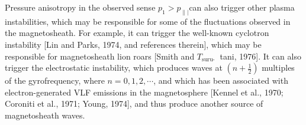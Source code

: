 \documentclass[10pt]{article}
\begin{document}
Pressure anisotropy in the observed sense $p_{1}>p_{\parallel \mid}$can also trigger other plasma instabilities, which may be responsible for some of the fluctuations observed in the magnetosheath. For example, it can trigger the well-known cyclotron instability [Lin and Parks, 1974, and references therein], which may be responsible for magnetosheath lion roars [Smith and $T_{\text {suru- }}$ tani, 1976]. It can also trigger the electrostatic instability, which produces waves at $\left(n+\frac{1}{2}\right)$ multiples of the gyrofrequency, where $n=0,1,2, \cdots$, and which has been associated with electron-generated VLF emissions in the magnetosphere [Kennel et al., 1970; Coroniti et al., 1971; Young, 1974], and thus produce another source of magnetosheath waves.
\end{document}
